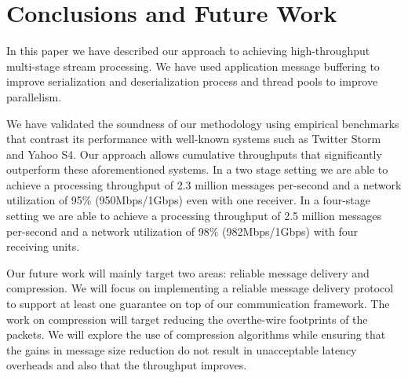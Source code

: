 \section{Conclusions and Future Work}
In this paper we have described our approach to achieving high-throughput multi-stage stream processing.  We have used application message buffering to improve serialization and deserialization process and thread pools to improve parallelism.

We have validated the soundness of our methodology using empirical benchmarks that contrast its performance with well-known systems such as Twitter Storm \cite{toshniwal2014storm} and Yahoo S4\cite{neumeyer2010s4}. Our approach allows cumulative throughputs that significantly outperform these aforementioned systems. In a two stage setting we are able to achieve a processing throughput of 2.3 million messages per-second and a network utilization of 95\% (950Mbps/1Gbps) even with one receiver. In a four-stage setting we are able to achieve a processing throughput of 2.5 million messages per-second and a network utilization of 98\% (982Mbps/1Gbps) with four receiving units.

Our future work will mainly target two areas: reliable message delivery and compression. We will focus on implementing a reliable message delivery protocol to support at least one guarantee on top of our communication framework.  The work on compression will target reducing the overthe-wire footprints of the packets. We will explore the use of compression algorithms while ensuring that the gains in message size reduction do not result in unacceptable latency overheads and also that the throughput improves. 

